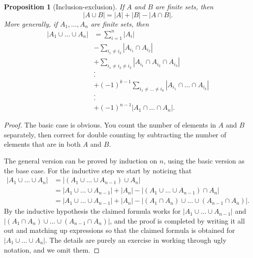 \documentclass{article}
\theoremstyle{plain}
\newtheorem{proposition}[theorem]{Proposition}{\bfseries}{\itshape}
\begin{document}
\begin{proposition}[Inclusion-exclusion]
If $A$ and $B$ are finite sets, then \[|A\cup B|=|A|+|B|-|A\cap B|.\]
More generally, if $A_1,\ldots,A_n$ are finite sets, then
\begin{align*}|A_1\cup\ldots\cup A_n| & =\sum_{i=1}^n |A_i| \\
&- \sum _{i_1\neq i_2} |A_{i_1}\cap A_{i_2}| \\
&+ \sum_{i_1\neq i_2\neq i_3} |A_{i_1}\cap A_{i_2}\cap A_{i_3}|\\
&.\\
&.\\
&+ (-1)^{k-1} \sum _{i_1\neq\ldots\neq i_k}|A_{i_1}\cap\ldots \cap A_{i_k}|\\
&.\\
&.\\
&+(-1)^{n-1} |A_1\cap\ldots \cap A_n|.
\end{align*}
\end{proposition}
\begin{proof}
The basic case is obvious. You count the number of elements in $A$ and $B$ separately, then correct for double counting by subtracting the number of elements that are in both $A$ and $B$. 

The general version can be proved by induction on $n$, using the basic version as the base case. For the inductive step we start by noticing that 
\begin{align*}
|A_1\cup\ldots\cup A_n| &= |(A_1\cup\ldots\cup A_{n-1})\cup A_n| \\
&= |A_1\cup\ldots\cup A_{n-1}| +|A_n| - |(A_1\cup\ldots\cup A_{n-1})\cap A_n |\\
&= |A_1\cup\ldots\cup A_{n-1}| +|A_n| - |(A_1\cap A_n)\cup\ldots\cup (A_{n-1}\cap A_n)|. 
\end{align*}
By the inductive hypothesis the claimed formula works for $|A_1\cup\ldots\cup A_{n-1}|$ and $|(A_1\cap A_n)\cup\ldots\cup (A_{n-1}\cap A_n)|$, and the proof is completed by writing it all out and matching up expressions so that the claimed formula is obtained for $|A_1\cup\ldots\cup A_n|$. The details are purely an exercise in working through ugly notation, and we omit them. 
\end{proof}
\end{document}
